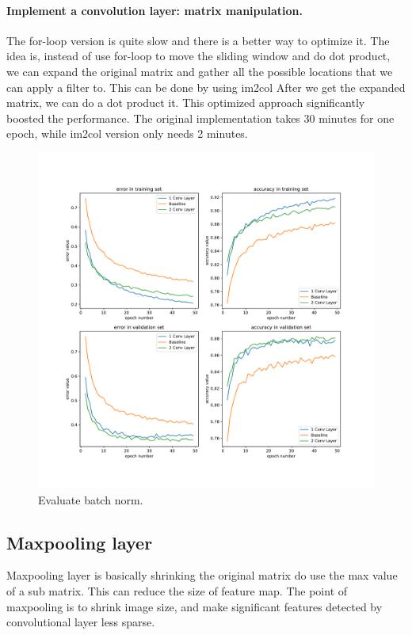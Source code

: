 \documentclass{article}
\begin{document}
\paragraph{Implement a convolution layer: matrix manipulation. }
The for-loop version is quite slow and there is a better way to optimize it. The idea is, instead of use for-loop to move the sliding window and do dot product, we can expand the original matrix and gather all the possible locations that we can apply a filter to. This can be done by using im2col \citep{im2col} After we get the expanded matrix, we can do a dot product it. This optimized approach significantly boosted the performance. The original implementation takes 30 minutes for one epoch, while im2col version only needs 2 minutes.


\begin{figure}[tb]
\begin{center}
\centerline{\includegraphics[width=\columnwidth]{fig/cnn.pdf}}
\caption{Evaluate batch norm.}
\label{fig:cnn}
\end{center}
\end{figure} 


\subsection{Maxpooling layer}
Maxpooling layer is basically shrinking the original matrix do use the max value of a sub matrix. This can reduce the size of feature map. The point of maxpooling is to shrink image size, and make significant features detected by convolutional layer less sparse. 
\end{document}
